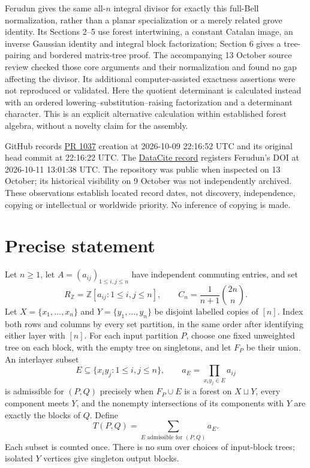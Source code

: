 \documentclass[11pt]{article}
\begin{document}
Ferudun \cite[Theorem 1.2(a)--(c)]{Ferudun} gives the same all-$n$ integral divisor for exactly this full-Bell normalization, rather than a planar specialization or a merely related grove identity. Its Sections 2--5 use forest intertwining, a constant Catalan image, an inverse Gaussian identity and integral block factorization; Section 6 gives a tree-pairing and bordered matrix-tree proof. The accompanying 13 October source review checked those core arguments and their normalization and found no gap affecting the divisor. Its additional computer-assisted exactness assertions were not reproduced or validated. Here the quotient determinant is calculated instead with an ordered lowering--substitution--raising factorization and a determinant character. This is an explicit alternative calculation within established forest algebra, without a novelty claim for the assembly.

GitHub records \href{https://github.com/AlecKriebel/Math/pull/1037}{PR 1037} creation at 2026-10-09 22:16:52 UTC and its original head commit at 22:16:22 UTC. The \href{https://api.datacite.org/dois/10.5281/zenodo.23298482}{DataCite record} registers Ferudun's DOI at 2026-10-11 13:01:38 UTC. The repository was public when inspected on 13 October; its historical visibility on 9 October was not independently archived. These observations establish located record dates, not discovery, independence, copying or intellectual or worldwide priority. No inference of copying is made.

\section*{Precise statement}
Let $n\geq1$, let $A=(a_{ij})_{1\leq i,j\leq n}$ have independent commuting entries, and set
\[
R_{\mathbb Z}=\mathbb Z[a_{ij}:1\leq i,j\leq n],\qquad C_n=\frac1{n+1}\binom{2n}{n}.
\]
Let $X=\{x_1,\ldots,x_n\}$ and $Y=\{y_1,\ldots,y_n\}$ be disjoint labelled copies of $[n]$. Index both rows and columns by every set partition, in the same order after identifying either layer with $[n]$. For each input partition $P$, choose one fixed unweighted tree on each block, with the empty tree on singletons, and let $F_P$ be their union. An interlayer subset
\[
E\subseteq\{x_i y_j:1\leq i,j\leq n\},\qquad a_E=\prod_{x_i y_j\in E}a_{ij}
\]
is admissible for $(P,Q)$ precisely when $F_P\cup E$ is a forest on $X\sqcup Y$, every component meets $Y$, and the nonempty intersections of its components with $Y$ are exactly the blocks of $Q$. Define
\[
T(P,Q)=\sum_{E\text{ admissible for }(P,Q)}a_E.\tag{1}
\]
Each subset is counted once. There is no sum over choices of input-block trees; isolated $Y$ vertices give singleton output blocks.
\end{document}
